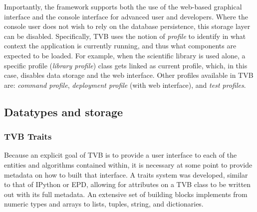 \documentclass{bioinfo}
\begin{document}
Importantly, the framework supports both the use of the web-based graphical
interface and the console interface for advanced user and developers. Where
the console user does not wish to rely on the database persistence, this 
storage layer can be disabled. Specifically, TVB uses the notion of \emph{profile} to 
identify in what context the application is currently running,
and thus what components are expected to be loaded.
For example, when the scientific library is used alone, a specific profile (\emph{library profile}) class 
gets linked as current profile, which, in this case, disables data storage and the web interface. Other profiles available
in TVB are: \emph{command profile}, \emph{deployment profile} (with web interface), and \emph{test profiles}.


%
%
%
%
%
%


\subsection{Datatypes and storage}

\subsubsection{TVB Traits}

Because an explicit goal of TVB is to provide a user interface to each of the
entities and algorithms contained within, it is necessary at some point to
provide metadata on how to built that interface. A traits system was
developed, similar to that of IPython or EPD, allowing for
attributes on a TVB class to be written out with its full metadata. An extensive
set of building blocks implements from numeric types and arrays to
lists, tuples, string, and dictionaries.
\end{document}

